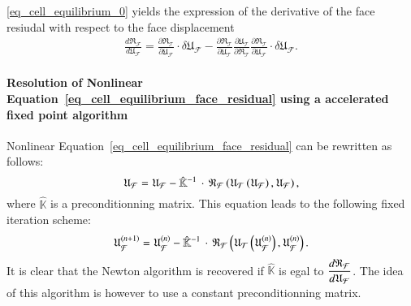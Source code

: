 \eqref{eq_cell_equilibrium_0} yields the expression of the derivative of
the face resiudal with respect to the face displacement
\begin{equation}
  \label{eq_cell_equilibrium_3}
  \begin{aligned}
    \frac{d\mathfrak{R}_{\mathcal{F}}}{d
      \mathfrak{U}_{\mathcal{F}}} = \frac{\partial
      \mathfrak{R}_{\mathcal{T}}}{\partial \mathfrak{U}_{\mathcal{F}}}
    \cdot \delta \mathfrak{U}_{\mathcal{F}} - \frac{\partial
      \mathfrak{R}_{\mathcal{T}}}{\partial \mathfrak{U}_{\mathcal{T}}}
    \frac{\partial \mathfrak{U}_{\mathcal{T}}}{\partial
      \mathfrak{R}_{\mathcal{T}}} \frac{\partial
      \mathfrak{R}_{\mathcal{T}}}{\partial \mathfrak{U}_{\mathcal{F}}}
    \cdot \delta \mathfrak{U}_{\mathcal{F}}.
  \end{aligned}
\end{equation}

\paragraph{Resolution of Nonlinear
  Equation~\eqref{eq_cell_equilibrium_face_residual} using a accelerated
  fixed point algorithm} Nonlinear
Equation~\eqref{eq_cell_equilibrium_face_residual} can be rewritten as
follows:
\[
\mathfrak{U}_{\mathcal{F}}=
\mathfrak{U}_{\mathcal{F}}-\hat{\mathbb{K}}^{-1}\,\cdot\,\mathfrak{R}_{\mathcal{F}}\paren{\mathfrak{U}_{\mathcal{T}}\paren{\mathfrak{U}_{\mathcal{F}}},
 \mathfrak{U}_{\mathcal{F}}},
\]
where \(\hat{\mathbb{K}}\) is a preconditionning matrix. This equation leads to the following fixed iteration scheme:
\[
\iter{n+1}{\mathfrak{U}_{\mathcal{F}}}=\iter{n}{\mathfrak{U}_{\mathcal{F}}}
- \hat{\mathbb{K}}^{-1}\,\cdot\,\mathfrak{R}_{\mathcal{F}}\paren{\mathfrak{U}_{\mathcal{T}}\paren{\iter{n}{\mathfrak{U}_{\mathcal{F}}}},
  \iter{n}{\mathfrak{U}_{\mathcal{F}}}}.
\]
%
%
%
It is clear that the Newton algorithm is recovered if
\(\hat{\mathbb{K}}\) is egal to
\(\derivtot{\mathfrak{R}_{\mathcal{F}}}{\mathfrak{U}_{\mathcal{F}}}\).
The idea of this algorithm is however to use a constant preconditionning
matrix.

